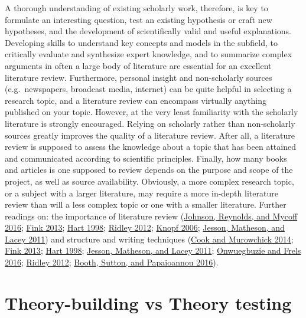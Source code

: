 \documentclass{book}
\begin{document}
A thorough understanding of existing scholarly work, therefore, is key to
formulate an interesting question, test an existing hypothesis or craft new
hypotheses, and the development of scientifically valid and useful
explanations. Developing skills to understand key concepts and models in the
subfield, to critically evaluate and synthesize expert knowledge, and to
summarize complex arguments in often a large body of literature are essential
for an excellent literature review. Furthermore, personal insight and
non-scholarly sources (e.g.~newspapers, broadcast media, internet) can be
quite helpful in selecting a research topic, and a literature review can
encompass virtually anything published on your topic. However, at the very
least familiarity with the scholarly literature is strongly encouraged.
Relying on scholarly rather than non-scholarly sources greatly improves the
quality of a literature review. After all, a literature review is supposed to
assess the knowledge about a topic that has been attained and communicated
according to scientific principles. Finally, how many books and articles is
one supposed to review depends on the purpose and scope of the project, as
well as source availability. Obviously, a more complex research topic, or a
subject with a larger literature, may require a more in-depth literature
review than will a less complex topic or one with a smaller literature.
Further readings on: the importance of literature review
(\protect\hyperlink{ref-johnsonPoliticalScienceResearch2016}{Johnson,
Reynolds, and Mycoff 2016};
\protect\hyperlink{ref-finkConductingResearchLiterature2013}{Fink 2013};
\protect\hyperlink{ref-hartDoingLiteratureReview1998}{Hart 1998};
\protect\hyperlink{ref-ridleyLiteratureReviewStepbyStep2012}{Ridley 2012};
\protect\hyperlink{ref-knopfDoingLiteratureReview2006}{Knopf 2006};
\protect\hyperlink{ref-jessonDoingYourLiterature2011}{Jesson, Matheson, and
Lacey 2011}) and structure and writing techniques
(\protect\hyperlink{ref-cookLiteratureReviewSkills2014}{Cook and Murowchick
2014}; \protect\hyperlink{ref-finkConductingResearchLiterature2013}{Fink
2013}; \protect\hyperlink{ref-hartDoingLiteratureReview1998}{Hart 1998};
\protect\hyperlink{ref-jessonDoingYourLiterature2011}{Jesson, Matheson, and
Lacey 2011};
\protect\hyperlink{ref-onwuegbuzieSevenStepsComprehensive2016}{Onwuegbuzie and
Frels 2016};
\protect\hyperlink{ref-ridleyLiteratureReviewStepbyStep2012}{Ridley 2012};
\protect\hyperlink{ref-boothSystematicApproachesSuccessful2016}{Booth, Sutton,
and Papaioannou 2016}).

\hypertarget{theory-building-vs-theory-testing}{%
\section{Theory-building vs Theory
testing}\label{theory-building-vs-theory-testing}}
\end{document}
